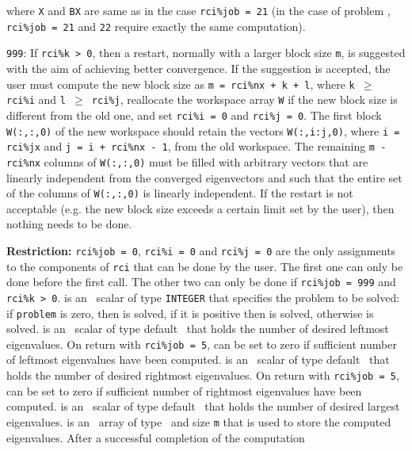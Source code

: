 \begin{description}
\begin{description}
where {\tt X} and {\tt BX} are same as in 
the case {\tt rci\%job = 21}
(in the case of problem ,
{\tt rci\%job = 21} and {\tt 22} 
require exactly the same computation).
%
\item
{\tt 999}: 
If {\tt rci\%k > 0}, then
a restart, normally with a larger block size {\tt m},
is suggested with the aim of achieving better convergence.
If the suggestion is accepted, the user must compute
the new block size as {\tt m = rci\%nx + k + l},
where {\tt k $\ge$ rci\%i} and {\tt l $\ge$ rci\%j},
reallocate the workspace array {\tt W}
if the new block size is different from the old one,
and set {\tt rci\%i = 0} and {\tt rci\%j = 0}.
The first block {\tt W(:,:,0)} of the new
workspace should retain the vectors 
{\tt W(:,i:j,0)},
where {\tt i = rci\%jx} and {\tt j = i + rci\%nx - 1},
from the old workspace.
The remaining {\tt m - rci\%nx} columns of {\tt W(:,:,0)}
must be filled
with arbitrary vectors that are linearly independent from 
the converged eigenvectors and such that
the entire set of the columns of {\tt W(:,:,0)}
is linearly independent.
If the restart is not acceptable
(e.g. the new block size exceeds a certain limit set by the user), 
then nothing needs to be done.
%
\end{description}
%
{\bf Restriction:} 
{\tt rci\%job = 0}, 
{\tt rci\%i = 0} and
{\tt rci\%j = 0} 
are the only %
assignments to the components of {\tt rci}
that can be done
by the user.
The first one can only be done before the first call.
The other two can only be done if
{\tt rci\%job = 999} and {\tt rci\%k > 0}.
%
 is an \intentin\ scalar of type {\tt INTEGER} that
specifies the problem to be solved:
if {\tt problem} is zero, then  is solved,
if it is positive then  is solved,
otherwise  is solved.
%
 is an \intentin\ scalar of type default \Integer\ 
that holds the number of desired leftmost eigenvalues.
On return with {\tt rci\%job = 5}, can be set to zero if
sufficient number of leftmost eigenvalues have been computed.
%
 is an \intentin\ scalar of type default \Integer\ 
that holds the number of desired rightmost eigenvalues.
On return with {\tt rci\%job = 5}, can be set to zero if
sufficient number of rightmost eigenvalues have been computed.
%
\itt{nep} is an \intentin\ scalar of type default \Integer\ 
that holds the number of desired largest eigenvalues.
%
\itt{lambda(:)} is an \intentinout\
array of type \REALDP\
and size {\tt m} 
that is
used to store the computed eigenvalues.
After a successful completion of the computation

\end{description}
